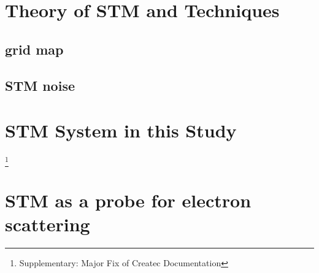 \section{Theory of STM and Techniques}
\subsection{grid map}
\subsection{STM noise}
\section{STM System in this Study}
\footnote{Supplementary: Major Fix of Createc Documentation}
\section{STM as a probe for electron scattering}
 